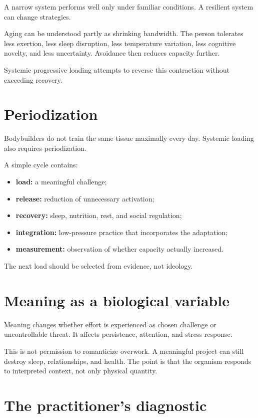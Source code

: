 A narrow system performs well only under familiar conditions. A resilient system can change strategies.

Aging can be understood partly as shrinking bandwidth. The person tolerates less exertion, less sleep disruption, less temperature variation, less cognitive novelty, and less uncertainty. Avoidance then reduces capacity further.

Systemic progressive loading attempts to reverse this contraction without exceeding recovery.

\section{Periodization}

Bodybuilders do not train the same tissue maximally every day. Systemic loading also requires periodization.

A simple cycle contains:

\begin{itemize}
\tightlist
\item
  \textbf{load:} a meaningful challenge;
\item
  \textbf{release:} reduction of unnecessary activation;
\item
  \textbf{recovery:} sleep, nutrition, rest, and social regulation;
\item
  \textbf{integration:} low-pressure practice that incorporates the adaptation;
\item
  \textbf{measurement:} observation of whether capacity actually increased.
\end{itemize}

The next load should be selected from evidence, not ideology.

\section{Meaning as a biological variable}

Meaning changes whether effort is experienced as chosen challenge or uncontrollable threat. It affects persistence, attention, and stress response.

This is not permission to romanticize overwork. A meaningful project can still destroy sleep, relationships, and health. The point is that the organism responds to interpreted context, not only physical quantity.

\section{The practitioner's diagnostic}


